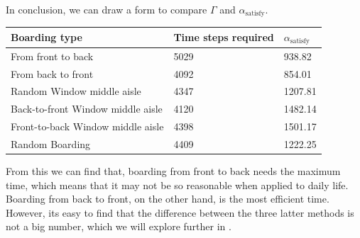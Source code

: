 \documentclass{article}
\begin{document}
	In conclusion, we can draw a form to compare $\Gamma$ and $\alpha_\text{satisfy}$.

	\begin{center}
	\begin{tabular}{||l|l|l||}
		\hline
		Boarding type&Time steps required&$\alpha_\text{satisfy}$\\
		\hline
		From front to back&5029&938.82\\
		From back to front&4092&854.01\\
		Random Window middle aisle&4347&1207.81\\
		Back-to-front Window middle aisle&4120&1482.14\\
		Front-to-back Window middle aisle&4398&1501.17\\
		Random Boarding&4409&1222.25\\
		\hline
	\end{tabular}
	\end{center}
	From this we can find that, boarding from front to back needs the maximum time, which means that it may not be so reasonable when applied to daily life. Boarding from back to front, on the other hand, is the most  efficient time. However, its easy to find that the difference between the three latter methods is not a big number, which we will explore further in .
\end{document}
